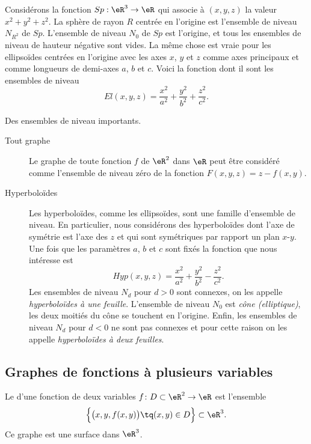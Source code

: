 Considérons la fonction \( Sp: \eR^3\to \eR\) qui associe à \( (x,y,z)\) la valeur \( x^2+y^2+z^2\). La sphère de rayon \( R\) centrée en l'origine est l'ensemble de niveau \( N_{R^2}\) de \( Sp\). L'ensemble de niveau \( N_{0}\) de \( Sp\) est l'origine, et tous les ensembles de niveau de hauteur négative sont vides. La même chose est vraie pour les ellipsoïdes centrées en l'origine avec les axes \( x\), \( y\) et \( z\) comme axes principaux et comme longueurs de demi-axes \( a\), \( b\) et \( c\). Voici la fonction dont il sont les ensembles de niveau
\[
	El(x,y,z)= \frac{x^2}{a^2}+\frac{y^2}{b^2}+\frac{z^2}{c^2}.
\]
\begin{example}
	Des ensembles de niveau importants.
	\begin{description}
		\item[Tout graphe]
		      Le graphe de toute fonction \( f\)  de \( \eR^2\) dans \( \eR\) peut être considéré comme l'ensemble de niveau zéro de la fonction \( F(x,y,z)=z-f(x,y)\).

		\item[Hyperboloïdes]
		      Les hyperboloïdes, comme les ellipsoïdes, sont une famille d'ensemble de niveau. En particulier, nous considérons des hyperboloïdes dont l'axe de symétrie est l'axe des \( z\) et qui sont symétriques par rapport un plan \( x\)-\( y\).  Une fois que les paramètres  \( a\), \( b\) et \( c\) sont fixés la fonction que nous intéresse est
		      \[
			      Hyp(x,y,z)= \frac{x^2}{a^2}+\frac{y^2}{b^2}-\frac{z^2}{c^2}.
		      \]
		      Les ensembles de niveau \( N_d\) pour \( d>0\) sont connexes, on les appelle \emph{hyperboloïdes à une feuille}. L'ensemble de niveau \( N_0\) est \emph{cône (elliptique)}, les deux moitiés du cône se touchent en l'origine. Enfin, les ensembles de niveau \( N_d\) pour \( d<0\) ne sont  pas connexes et pour cette raison on les appelle \emph{hyperboloïdes à deux feuilles}.
	\end{description}
\end{example}

\subsection{Graphes de fonctions à plusieurs variables}

Le  d'une fonction de deux variables \( f\colon D\subset\eR^2\to \eR\) est l'ensemble
\begin{equation}
	\Big\{   \big( x,y,f(x,y) \big) \tq (x,y)\in D \Big\}\subset\eR^3.
\end{equation}
Ce graphe est une surface dans \( \eR^3\).

